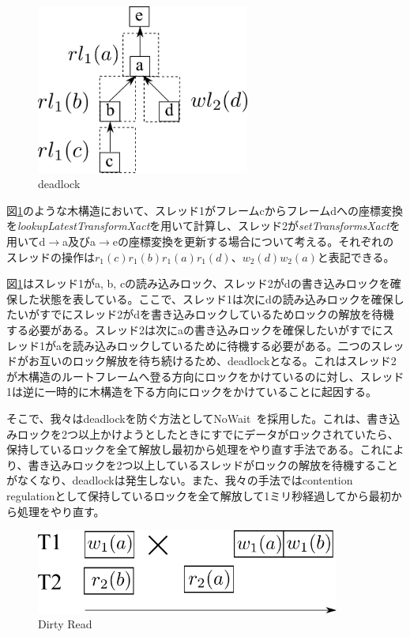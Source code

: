 \documentclass[a4paper]{jreport}	%
\begin{document}
\begin{figure}[h] 
\centering
\includegraphics[width=7cm]{deadlock}
\caption{deadlock}
\label{fig:deadlock}
\end{figure}

図\ref{fig:deadlock}のような木構造において、スレッド1がフレームcからフレームdへの座標変換を\textit{lookupLatestTransformXact}を用いて計算し、スレッド2が\textit{setTransformsXact}を用いてd$\rightarrow$a及びa$\rightarrow$eの座標変換を更新する場合について考える。それぞれのスレッドの操作は$r_1(c)r_1(b)r_1(a)r_1(d)$、$w_2(d)w_2(a)$と表記できる。

図\ref{fig:deadlock}はスレッド1がa, b, cの読み込みロック、スレッド2がdの書き込みロックを確保した状態を表している。ここで、スレッド1は次にdの読み込みロックを確保したいがすでにスレッド2がdを書き込みロックしているためロックの解放を待機する必要がある。スレッド2は次にaの書き込みロックを確保したいがすでにスレッド1がaを読み込みロックしているために待機する必要がある。二つのスレッドがお互いのロック解放を待ち続けるため、deadlockとなる。これはスレッド2が木構造のルートフレームへ登る方向にロックをかけているのに対し、スレッド1は逆に一時的に木構造を下る方向にロックをかけていることに起因する。


そこで、我々はdeadlockを防ぐ方法としてNoWait~\cite{nowait}を採用した。これは、書き込みロックを2つ以上かけようとしたときにすでにデータがロックされていたら、保持しているロックを全て解放し最初から処理をやり直す手法である。これにより、書き込みロックを2つ以上しているスレッドがロックの解放を待機することがなくなり、deadlockは発生しない。また、我々の手法ではcontention regulationとして保持しているロックを全て解放して1ミリ秒経過してから最初から処理をやり直す。

\begin{figure}[h] 
\centering
\includegraphics[width=10cm]{dirty-read}
\caption{Dirty Read}
\label{fig:dirty-read}
\end{figure}
\end{document}
